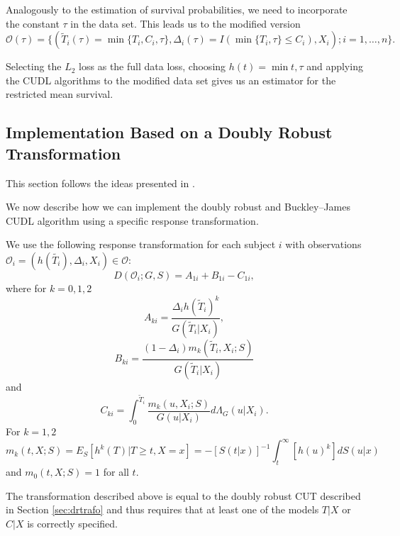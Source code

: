 \documentclass[12pt, a4paper]{scrartcl}
\theoremstyle{definition}
\theoremstyle{plain}
\numberwithin{equation}{section}
\numberwithin{figure}{section}
\numberwithin{table}{section}
\begin{document}
	Analogously to the estimation of survival probabilities, we need to incorporate the constant $\tau$ in the data set.
	This leads us to the modified version	
	\begin{equation*}
		\mathcal{O}(\tau) = \{(\tilde{T}_i(\tau) = \min\{T_i, C_i, \tau\}, \Delta_i(\tau) = I(\min\{T_i, \tau\}\leq C_i), X_i); i = 1, \dots , n\}.
	\end{equation*}
	
	Selecting the $L_2$ loss as the full data loss, choosing $h(t) = \min{t,\tau}$ and applying the CUDL algorithms to the modified data set gives us an estimator for the restricted mean survival.
	
	\subsection{Implementation Based on a Doubly Robust Transformation}\label{trafo}

	This section follows the ideas presented in \citet*{basearticle}.
	
	We now describe how we can implement the doubly robust and Buckley--James CUDL algorithm using a specific response transformation.
	
		
	We use the following response transformation for each subject $i$ with observations $\mathcal{O}_i = (h(\tilde{T_i}), \Delta_i, X_i) \in \mathcal{O}$:
	\begin{equation*}
	D(\mathcal O_i; G,S) = A_{1i}+B_{1i} - C_{1i},
	\end{equation*}
	where for $k=0,1,2$
	\begin{equation*}
	A_{ki} = \frac{\Delta_i h(\tilde{T}_i)^k}{G(\tilde{T}_i\vert X_i)},
	\end{equation*}
	\begin{equation*}
	B_{ki} = \frac{(1-\Delta_i)m_k(\tilde{T}_i, X_i; S)}{G(\tilde{T}_i\vert X_i)}
	\end{equation*}
	and
	\begin{equation*}
	C_{ki} = \int_{0}^{\tilde{T}_i} \frac{m_k(u, X_i; S)}{G(u \vert X_i)}d\Lambda_G(u \vert X_i).
	\end{equation*}
	For $k=1,2$
	\begin{equation}\label{eq:condexp}
	m_k(t,X;S) = E_S[h^k(T) \vert T \geq t, X = x] = -[S(t\vert x)]^{-1} \int_{t}^{\infty}[h(u)^k]dS(u\vert x)
	\end{equation}
	and $m_0(t,X;S) = 1$ for all $t$.
	
	The transformation described above is equal to the doubly robust CUT described in Section \ref{sec:drtrafo} and thus requires that at least one of the models $T\vert X$ or $C \vert X$ is correctly specified.
	
\end{document}
